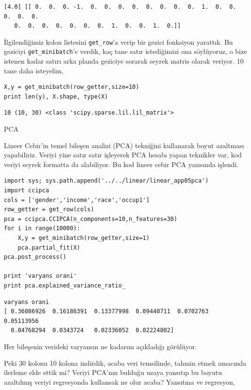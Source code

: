 \documentclass[12pt,fleqn]{article}\usepackage{../../common}
\begin{document}
\begin{verbatim}
[4.0] [[ 0.  0.  0. -1.  0.  0.  0.  0.  0.  0.  0.  0.  1.  0.  0.  0.  0.  0.
   0.  0.  0.  0.  0.  0.  0.  1.  0.  0.  1.  0.]]
\end{verbatim}

İlgilendiğimiz kolon listesini \verb!get_row!'a verip bir gezici fonksiyon
yarattık. Bu geziciyi \verb!get_minibatch!'e verdik, kaç tane satır
istediğimizi ona söylüyoruz, o bize istenen kadar satırı arka planda
geziciye sorarak seyrek matris olarak veriyor. 10 tane daha isteyelim,

\begin{verbatim}
X,y = get_minibatch(row_getter,size=10)
print len(y), X.shape, type(X)
\end{verbatim}

\begin{verbatim}
10 (10, 30) <class 'scipy.sparse.lil.lil_matrix'>
\end{verbatim}

PCA

Lineer Cebir'in temel bileşen analizi (PCA) tekniğini kullanarak boyut
azaltması yapabiliriz. Veriyi yine satır satır işleyerek PCA hesabı yapan
teknikler var, kod veriyi seyrek formatta da alabiliyor. Bu kod lineer
cebir PCA yazısında işlendi. 

\begin{verbatim}
import sys; sys.path.append('../../linear/linear_app05pca')
import ccipca
cols = ['gender','income','race','occup1']
row_getter = get_row(cols)
pca = ccipca.CCIPCA(n_components=10,n_features=30)
for i in range(10000): 
    X,y = get_minibatch(row_getter,size=1)
    pca.partial_fit(X)
pca.post_process()

print 'varyans orani'
print pca.explained_variance_ratio_
\end{verbatim}

\begin{verbatim}
varyans orani
[ 0.36086926  0.16186391  0.13377998  0.09440711  0.0702763   0.05113956
  0.04768294  0.0343724   0.02336052  0.02224802]
\end{verbatim}

Her bileşenin verideki varyansın ne kadarını açıkladığı görülüyor. 

Peki 30 kolonu 10 kolona indirdik, acaba veri temsilinde, tahmin etmek
amacında ilerleme elde ettik mi?  Veriyi PCA'nın bulduğu uzaya yansıtıp bu
boyutu azaltılmış veriyi regresyonda kullansak ne olur acaba? Yansıtma ve
regresyon,
\end{document}
